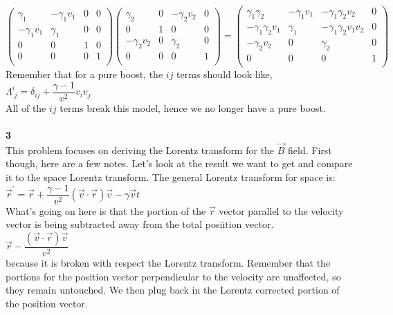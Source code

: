 \documentclass[prb,preprint]
{revtex4-1}
\newcommand{\PRLsep}{\noindent\makebox[\linewidth]{\resizebox{0.8888\linewidth}{2pt}{$\bullet$}}\bigskip}
\begin{document}
\\
$\begin{pmatrix}
\gamma_1 & -\gamma_1 v_1 & 0 & 0\\
-\gamma_1 v_1 & \gamma_1 & 0 & 0\\
0 & 0 & 1 & 0\\
0 & 0 & 0 & 1\\
\end{pmatrix} 
\begin{pmatrix}
\gamma_2 & 0 & -\gamma_2 v_2 & 0\\
0 & 1 & 0 & 0\\
-\gamma_2 v_2 & 0 & \gamma_2 & 0\\
0 & 0 & 0 & 1\\
\end{pmatrix} = 
\begin{pmatrix}
\gamma_1 \gamma_2 & -\gamma_1 v_1 & -\gamma_1 \gamma_2 v_2 & 0\\
-\gamma_1 \gamma_2 v_1 & \gamma_1 & -\gamma_1 \gamma_2 v_1 v_2 & 0\\
-\gamma_2 v_2 & 0 & \gamma_2 & 0\\
0 & 0 & 0 & 1\\
\end{pmatrix}$
\\
Remember that for a pure boost, the $ij$ terms should look like,
\\
$\Lambda^i_{\; j} = \delta_{ij} + \dfrac{\gamma - 1}{v^2} v_i v_j$
\\
All of the $ij$ terms break this model, hence we no longer have a pure boost.
\\
\PRLsep
\\
{\bf 3}\\
This problem focuses on deriving the Lorentz transform for the $\vec{B}$ field.  First though, here are a few notes.  Let's look at the result we want to get and compare it to the space Lorentz transform.  The general Lorentz transform for space is:
\\
$\vec{r}^\prime = \vec{r} + \dfrac{\gamma - 1}{v^2} \left(\vec{v} \cdot \vec{r}\right)\vec{v} - \gamma \vec{v} t$
\\
What's going on here is that the portion of the $\vec{r}$ vector parallel to the velocity vector is being subtracted away from the total posiition vector.  
\\
$\vec{r} - \dfrac{\left(\vec{v} \cdot \vec{r}\right)\vec{v}}{v^2}$
\\
because it is broken with respect the Lorentz transform.  Remember that the portions for the position vector perpendicular to the velocity are unaffected, so they remain untouched.  We then plug back in the Lorentz corrected portion of the position vector.
\end{document}
